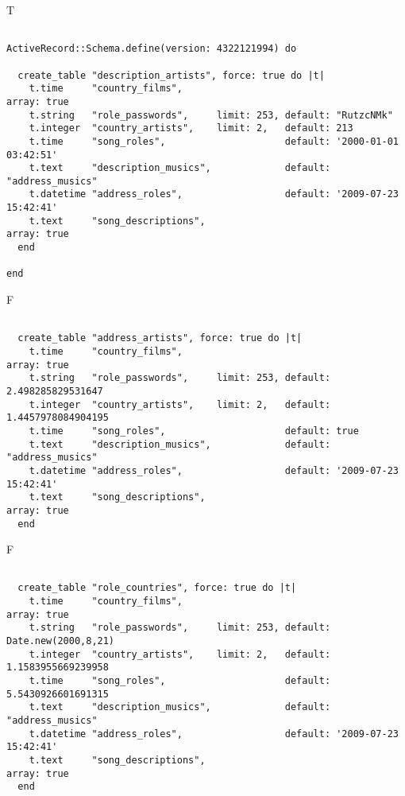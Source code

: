 T
\begin{verbatim}

ActiveRecord::Schema.define(version: 4322121994) do

  create_table "description_artists", force: true do |t|
    t.time     "country_films",                                                  array: true
    t.string   "role_passwords",     limit: 253, default: "RutzcNMk"
    t.integer  "country_artists",    limit: 2,   default: 213
    t.time     "song_roles",                     default: '2000-01-01 03:42:51'
    t.text     "description_musics",             default: "address_musics"
    t.datetime "address_roles",                  default: '2009-07-23 15:42:41'
    t.text     "song_descriptions",                                              array: true
  end

end
\end{verbatim}


F
\begin{verbatim}

  create_table "address_artists", force: true do |t|
    t.time     "country_films",                                                  array: true
    t.string   "role_passwords",     limit: 253, default: 2.498285829531647
    t.integer  "country_artists",    limit: 2,   default: 1.4457978084904195
    t.time     "song_roles",                     default: true
    t.text     "description_musics",             default: "address_musics"
    t.datetime "address_roles",                  default: '2009-07-23 15:42:41'
    t.text     "song_descriptions",                                              array: true
  end

\end{verbatim}

F
\begin{verbatim}

  create_table "role_countries", force: true do |t|
    t.time     "country_films",                                                  array: true
    t.string   "role_passwords",     limit: 253, default: Date.new(2000,8,21)
    t.integer  "country_artists",    limit: 2,   default: 1.1583955669239958
    t.time     "song_roles",                     default: 5.5430926601691315
    t.text     "description_musics",             default: "address_musics"
    t.datetime "address_roles",                  default: '2009-07-23 15:42:41'
    t.text     "song_descriptions",                                              array: true
  end

\end{verbatim}

